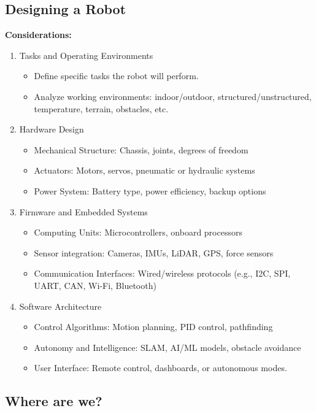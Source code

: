 \documentclass[10pt]{article}
\begin{document}
\subsection*{Designing a Robot}
\textbf{Considerations:}
\begin{enumerate}
    \item Tasks and Operating Environments
    \begin{itemize}
        \item Define specific tasks the robot will perform.
        \item Analyze working environments: indoor/outdoor, structured/unstructured, temperature, terrain, obstacles, etc.
    \end{itemize}
    \item Hardware Design
    \begin{itemize}
        \item Mechanical Structure: Chassis, joints, degrees of freedom
        \item Actuators: Motors, servos, pneumatic or hydraulic systems
        \item Power System: Battery type, power efficiency, backup options
    \end{itemize}
    \item Firmware and Embedded Systems
    \begin{itemize}
        \item Computing Units: Microcontrollers, onboard processors
        \item Sensor integration: Cameras, IMUs, LiDAR, GPS, force sensors
        \item Communication Interfaces: Wired/wireless protocols (e.g., I2C, SPI, UART, CAN, Wi-Fi, Bluetooth)
    \end{itemize}
    \item Software Architecture
    \begin{itemize}
        \item Control Algorithms: Motion planning, PID control, pathfinding
        \item Autonomy and Intelligence: SLAM, AI/ML models, obstacle avoidance
        \item User Interface: Remote control, dashboards, or autonomous modes.
    \end{itemize}
\end{enumerate}

\subsection*{Where are we?}
\end{document}
